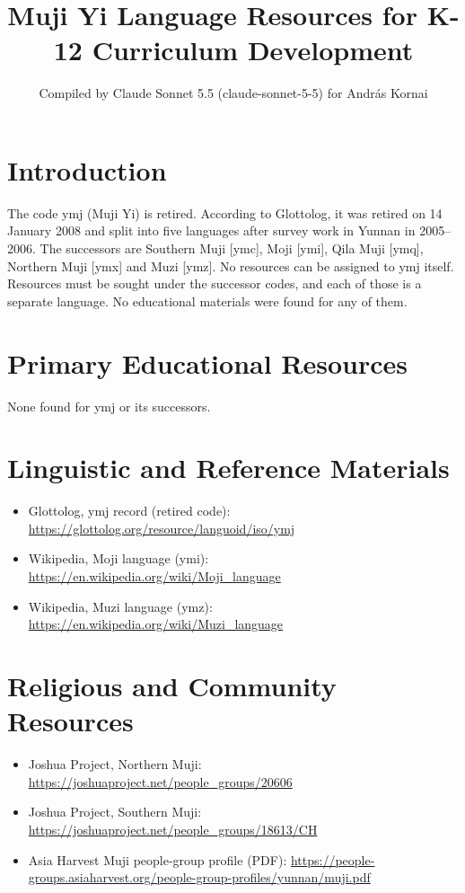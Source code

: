 \documentclass[12pt]{article}
\title{Muji Yi Language Resources for K-12 Curriculum Development}
\author{Compiled by Claude Sonnet 5.5 (claude-sonnet-5-5) for Andr\'as Kornai}
\date{}
\begin{document}
\maketitle

\section{Introduction}
The code ymj (Muji Yi) is retired. According to Glottolog, it was retired on 14 January 2008 and split into five languages after survey work in Yunnan in 2005--2006. The successors are Southern Muji [ymc], Moji [ymi], Qila Muji [ymq], Northern Muji [ymx] and Muzi [ymz]. No resources can be assigned to ymj itself. Resources must be sought under the successor codes, and each of those is a separate language. No educational materials were found for any of them.

\section{Primary Educational Resources}
None found for ymj or its successors.

\section{Linguistic and Reference Materials}
\begin{itemize}
\item Glottolog, ymj record (retired code): \url{https://glottolog.org/resource/languoid/iso/ymj}
\item Wikipedia, Moji language (ymi): \url{https://en.wikipedia.org/wiki/Moji_language}
\item Wikipedia, Muzi language (ymz): \url{https://en.wikipedia.org/wiki/Muzi_language}
\end{itemize}

\section{Religious and Community Resources}
\begin{itemize}
\item Joshua Project, Northern Muji: \url{https://joshuaproject.net/people_groups/20606}
\item Joshua Project, Southern Muji: \url{https://joshuaproject.net/people_groups/18613/CH}
\item Asia Harvest Muji people-group profile (PDF): \url{https://people-groups.asiaharvest.org/people-group-profiles/yunnan/muji.pdf}
\end{itemize}
\end{document}
